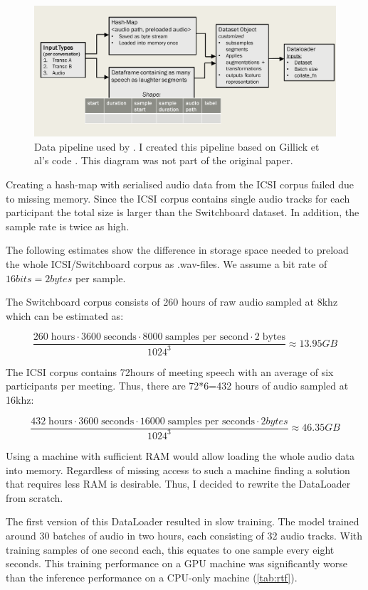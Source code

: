 \documentclass[bsc,frontabs,parskip,deptreport]{infthesis}
\begin{document}
\begin{figure}
    \centering
    \includegraphics[width=14cm]{imgs/diagrams/Gillick_et_al_data_pipeline.png}
    \caption{Data pipeline used by \citet{gillick2021robust}. I created this pipeline based on Gillick et al's code \citep{gillick-codebase}. This diagram was not part of the original paper.}
    \label{fig:gillick-data-pipeline}
\end{figure}

Creating a hash-map with serialised audio data from the ICSI corpus failed due to missing memory. Since the ICSI corpus contains single audio tracks for each participant the total size is larger than the Switchboard dataset. In addition, the sample rate is twice as high. 

The following estimates show the difference in storage space needed to preload the whole ICSI/Switchboard corpus as .wav-files. We assume a bit rate of $16bits=2bytes$ per sample.

The Switchboard corpus consists of 260 hours of raw audio sampled at 8khz which can be estimated as:

$$ \frac{260\;\textrm{hours} \cdot 3600\;\textrm{seconds} \cdot 8000\;\textrm{samples per second} \cdot 2\;\textrm{bytes}}{1024^3} \approx 13.95 GB $$  

The ICSI corpus contains 72hours of meeting speech with an average of six participants per meeting. Thus, there are 72*6=432 hours of audio sampled at 16khz:

$$ \frac{432\;\textrm{hours} \cdot 3600\;\textrm{seconds} \cdot 16000 \;\textrm{samples per seconds} \cdot 2bytes}{1024^3} \approx 46.35 GB $$

Using a machine with sufficient RAM would allow loading the whole audio data into memory. 
Regardless of missing access to such a machine finding a solution that requires less RAM is desirable. Thus, I decided to rewrite the DataLoader from scratch. 

The first version of this DataLoader resulted in slow training. The model trained around 30 batches of audio in two hours, each consisting of 32 audio tracks. 
With training samples of one second each, this equates to one sample every eight seconds.
This training performance on a GPU machine was significantly worse than the inference performance on a CPU-only machine (\autoref{tab:rtf}).
\end{document}
